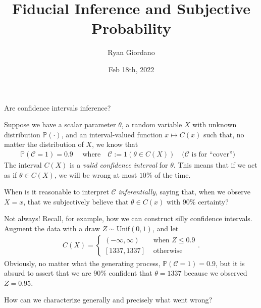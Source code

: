 \documentclass[8pt]{beamer}\usepackage[]{graphicx}\usepackage[]{color}
\title{Fiducial Inference and Subjective Probability}
\author{Ryan Giordano}
\date{Feb 18th, 2022}
\institute{Massachusetts Institute of Technology}
\def\p#1{\mathbb{P}\left(#1\right)}
\def\ind#1{1\left(#1\right)}
\def\cover{\mathcal{C}}
\begin{document}

\begin{frame}{Are confidence intervals inference?}

Suppose we have a scalar parameter $\theta$, a random variable $X$ with unknown
distribution $\p{\cdot}$, and an interval-valued function $x \mapsto C(x)$ such
that, no matter the distribution of $X$, we know that
%
\begin{align*}
%
\p{\cover = 1} = 0.9
\quad\textrm{ where}\quad
\cover := \ind{\theta \in C(X)}
\quad\textrm{(}\cover\textrm{ is for ``cover'')}\quad
%
\end{align*}
%
The interval $C(X)$ is a {\em valid confidence interval} for $\theta$. This
means that if we act as if $\theta \in C(X)$, we will be wrong at most $10\%$ of
the time.

\pause

\hrulefill

When is it reasonable to interpret $\cover$ {\em inferentially}, saying
that, when we observe $X=x$, that we subjectively believe that $\theta \in C(x)$
with $90\%$ certainty?

\pause
Not always!
Recall, for example, how we can construct silly confidence
intervals. Augment the data with a draw $Z \sim \mathrm{Unif}(0, 1)$, and let
%
\begin{align*}
%
C(X) =
\begin{cases}
    (-\infty, \infty) & \textrm{ when } Z \le 0.9 \\
    [1337, 1337] & \textrm{ otherwise }
\end{cases}.
%
\end{align*}
%
Obviously, no matter what the generating process, $\p{\cover = 1} = 0.9$,
but it is absurd to assert that we are $90\%$ confident that
$\theta = 1337$ because we observed $Z = 0.95$.

\pause

How can we characterize generally and precisely what went wrong?
%
\end{frame}



\end{document}
